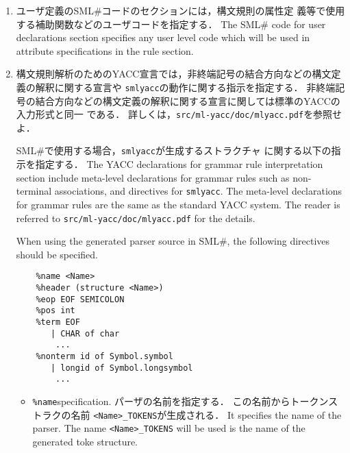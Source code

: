 \documentclass{jbook}
\newcommand{\txt}[2]{#2}
\newcommand{\smlsharp}{SML\#}
\newcommand{\code}[1]{\mbox{\large\tt #1}}
\begin{document}
\begin{enumerate}
\item 
\ifjp%
	ユーザ定義の\smlsharp{}コードのセクションには，構文規則の属性定
義等で使用する補助関数などのユーザコードを指定する．
\else%
	The \smlsharp{} code for user declarations section specifies 
any user level code which will be used in attribute specifications in the 
rule section.
\fi%

\item 
\ifjp%
	構文規則解析のためのYACC宣言では，非終端記号の結合方向などの構文定義の解釈に関する宣言や
\code{smlyacc}の動作に関する指示を指定する．
	非終端記号の結合方向などの構文定義の解釈に関する宣言に関しては標準のYACCの入力形式と同一
である．
	詳しくは，\code{src/ml-yacc/doc/mlyacc.pdf}を参照せよ．

	\smlsharp{}で使用する場合，\code{smlyacc}が生成するストラクチャ
に関する以下の指示を指定する．
\else%
	The YACC declarations for grammar rule interpretation section include
meta-level declarations for grammar rules such as non-terminal associations,
and directives for \code{smlyacc}.
	The meta-level declarations for grammar rules are the same as
the standard YACC system. 
	The reader is referred to \code{src/ml-yacc/doc/mlyacc.pdf} for
the details.

	When using the generated parser source in \smlsharp{}, the following
directives should be specified.
\fi%
\begin{verbatim}
    %name <Name>
    %header (structure <Name>)
    %eop EOF SEMICOLON
    %pos int
    %term EOF
       | CHAR of char
        ...
    %nonterm id of Symbol.symbol
       | longid of Symbol.longsymbol
        ...
\end{verbatim}

\begin{itemize}
\item \verb|%name|\txt{指定}{specification}.
\ifjp%
	パーザの名前を指定する．
	この名前からトークンストラクの名前
\verb|<Name>_TOKENS|が生成される．
\else%
	It specifies the name of the parser.
	The name \verb|<Name>_TOKENS| will be used is the name of the
generated toke structure. 
\fi%


\end{itemize}
\end{enumerate}
\end{document}
